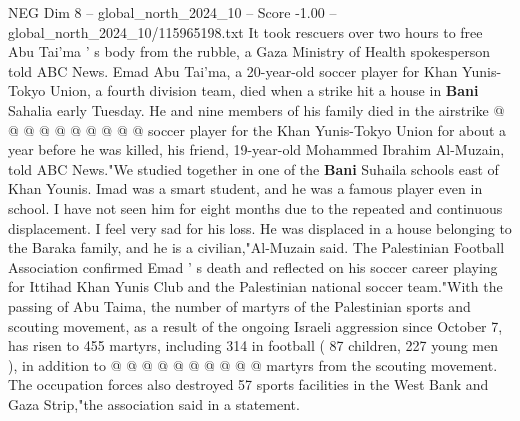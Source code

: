 \begin{textsample}{NEG Dim 8 – global\_north\_2024\_10 – Score -1.00 – global\_north\_2024\_10/115965198.txt}
It took rescuers over two hours to free Abu Tai'ma ' s body from the rubble, a Gaza Ministry of Health spokesperson told ABC News.
Emad Abu Tai'ma, a 20-year-old soccer player for Khan Yunis-Tokyo Union, a fourth division team, died when a strike hit a house in \textbf{Bani} Sahalia early Tuesday.
He and nine members of his family died in the airstrike @ @ @ @ @ @ @ @ @ @ soccer player for the Khan Yunis-Tokyo Union for about a year before he was killed, his friend, 19-year-old Mohammed Ibrahim Al-Muzain, told ABC News."We studied together in one of the \textbf{Bani} Suhaila schools east of Khan Younis.
Imad was a smart student, and he was a famous player even in school.
I have not seen him for eight months due to the repeated and continuous displacement.
I feel very sad for his loss.
He was displaced in a house belonging to the Baraka family, and he is a civilian,"Al-Muzain said.
The Palestinian Football Association confirmed Emad ' s death and reflected on his soccer career playing for Ittihad Khan Yunis Club and the Palestinian national soccer team."With the passing of Abu Taima, the number of martyrs of the Palestinian sports and scouting movement, as a result of the ongoing Israeli aggression since October 7, has risen to 455 martyrs, including 314 in football ( 87 children, 227 young men ), in addition to @ @ @ @ @ @ @ @ @ @ martyrs from the scouting movement.
The occupation forces also destroyed 57 sports facilities in the West Bank and Gaza Strip,"the association said in a statement.

\end{textsample}
